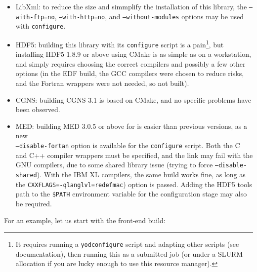\documentclass[a4paper,10pt,twoside]{csshortdoc}
\begin{document}
\begin{itemize}
\item LibXml: to reduce the size and simmplify the installation of this
library, the \texttt{--with-ftp=no}, \texttt{--with-http=no},
and \texttt{--without-modules} options may be used with \texttt{configure}.
\item HDF5: building this library with its \texttt{configure} script
is a pain\footnote{It requires running a \texttt{yodconfigure}
script and adapting other scripts (see documentation), then running
this as a submitted job (or under a SLURM allocation if you are lucky
enough to use this resource manager).}, but installing HDF5 1.8.9 or above
using CMake is as simple as on a workstation, and simply requires
choosing the correct compilers and possibly a few other options (in
the EDF \CS build, the GCC compilers were chosen to reduce risks, and
the Fortran wrappers were not needed, so not built).
\item CGNS: building CGNS 3.1 is based on CMake, and no specific
problems have been observed.
\item MED: building MED 3.0.5 or above for \CS is easier than previous versions,
as a new \\ \texttt{--disable-fortan} option is available for the
\texttt{configure} script. Both the C and C++ compiler wrappers
must be specified, and the link may fail with the GNU compilers, due
to some shared library issue (trying to force \texttt{--disable-shared}).
With the IBM XL compilers, the same build works fine, as long as the
\texttt{CXXFLAGS=-qlanglvl=redefmac}) option is passed. Adding
the HDF5 tools path to the \texttt{\$PATH} environment variable for
the  configuration stage may also be required.
\end{itemize}

For an example, let us start with the front-end build:

\end{document}
